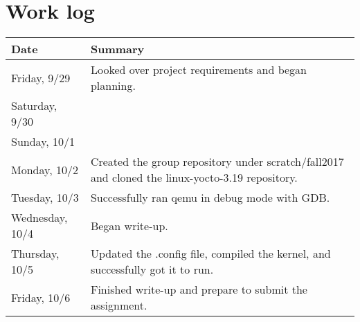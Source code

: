 \documentclass[10pt,letterpaper,titlepage]{article}
\begin{document}
\section{Work log}

\begin{tabular}{|l|p{12cm}|} \hline
Date & Summary\\ \hline
Friday, 9/29 & Looked over project requirements and began planning.\\ \hline
Saturday, 9/30 &\\ \hline
Sunday, 10/1 &\\ \hline
Monday, 10/2 & Created the group repository under scratch/fall2017 and cloned the linux-yocto-3.19 repository. \\\hline
Tuesday, 10/3 &  Successfully ran qemu in debug mode with GDB. \\ \hline
Wednesday, 10/4 & Began write-up. \\ \hline
Thursday, 10/5 & Updated the .config file, compiled the kernel, and successfully got it to run. \\ \hline
Friday, 10/6 & Finished write-up and prepare to submit the assignment.\\ \hline

\end{tabular}
\end{document}

